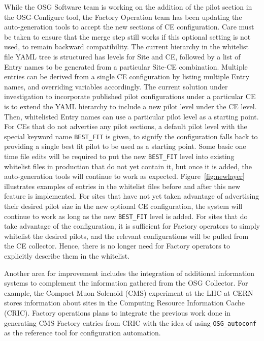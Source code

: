 \documentclass[manuscript,screen,review]{acmart}
\begin{document}
While the OSG Software team is working on the addition of the pilot section in the OSG-Configure tool, the Factory Operation team has been updating the auto-generation tools to accept the new sections of CE configuration. Care must be taken to ensure that the merge step still works if this optional setting is not used, to remain backward compatibility. The current hierarchy in the whitelist file YAML tree is structured has levels for Site and CE, followed by a list of Entry names to be generated from a particular Site-CE combination. Multiple entries can be derived from a single CE configuration by listing multiple Entry names, and overriding variables accordingly. The current solution under investigation to incorporate published pilot configurations under a particular CE is to extend the YAML hierarchy to include a new pilot level under the CE level. Then, whitelisted Entry names can use a particular pilot level as a starting point. For CEs that do not advertise any pilot sections, a default pilot level with the special keyword name \verb"BEST_FIT" is given, to signify the configuration falls back to providing a single best fit pilot to be used as a starting point. Some basic one time file edits will be required to put the new \verb"BEST_FIT" level into existing whitelist files in production that do not yet contain it, but once it is added, the auto-generation tools will continue to work as expected. Figure~\ref{fig:newlayer} illustrates examples of entries in the whitelist files before and after this new feature is implemented. For sites that have not yet taken advantage of advertising their desired pilot size in the new optional CE configuration, the system will continue to work as long as the new \verb"BEST_FIT" level is added. For sites that do take advantage of the configuration, it is sufficient for Factory operators to simply whitelist the desired pilots, and the relevant configurations will be pulled from the CE collector. Hence, there is no longer need for Factory operators to explicitly describe them in the whitelist.

Another area for improvement includes the integration of additional information systems to complement the information gathered from the OSG Collector. For example, the Compact Muon Solenoid (CMS) experiment at the LHC at CERN stores information about sites in the Computing Resource Information Cache (CRIC)\cite{CRIC2017}. Factory operations plans to integrate the previous work done in generating CMS Factory entries from CRIC \cite{AutoconfCRIC} with the idea of using \verb"OSG_autoconf" as the reference tool for configuration automation.
\end{document}
